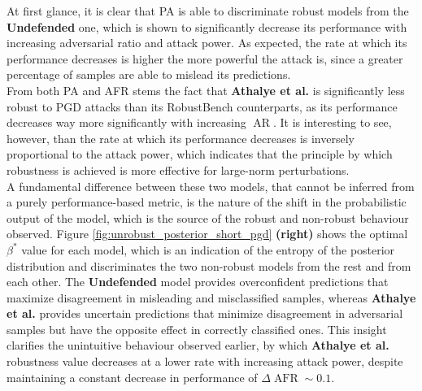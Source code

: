 At first glance, it is clear that PA is able to discriminate robust models from
the {\color{tab:orange} \textbf{Undefended}} one, which is shown to significantly
decrease its performance with increasing adversarial ratio and attack power. As expected, 
the rate at which its performance decreases is higher
the more powerful the attack is, since a greater percentage of samples are able to
mislead its predictions. \\

From both PA and AFR stems the fact that {\color{tab:green} \textbf{Athalye et al.}}
is significantly less robust to PGD attacks than its RobustBench counterparts, as 
its performance decreases
way more significantly with increasing $\operatorname{AR}$. It is interesting to see, however,
than the rate at which its performance decreases is inversely proportional to the 
attack power, which indicates that the principle by which robustness is achieved
is more effective for large-norm perturbations. \\

A fundamental difference between these two models, that cannot be
inferred from a purely performance-based metric, is the nature of the shift in
the probabilistic output of the model, which is the source of the robust and non-robust
behaviour observed. Figure \ref{fig:unrobust_posterior_short_pgd} \textbf{(right)}
shows the optimal $\beta^{*}$ value for each model, which is an indication of
the entropy of the posterior distribution and discriminates the two non-robust
models from the rest and from each other. The {\color{tab:orange} \textbf{Undefended}}
model provides overconfident predictions that maximize disagreement in misleading and 
misclassified samples, whereas {\color{tab:green} \textbf{Athalye et al.}} provides 
uncertain predictions that minimize disagreement in adversarial samples but have 
the opposite effect in correctly classified ones. This insight clarifies the 
unintuitive behaviour observed earlier, by which {\color{tab:green} \textbf{Athalye et al.}} 
robustness value decreases at a lower rate with increasing attack power, despite maintaining a
constant decrease in performance of $\Delta \operatorname{AFR} \sim 0.1$. \\


